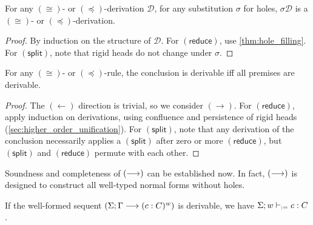 \documentclass[twoside]{report}
\begin{document}
\begin{proposition}
    \label{thm:conversion_calculus_stability}
    For any $(\cong)$- or $(\preceq)$-derivation $\mathcal D$, for any substitution $\sigma$ for holes, $\sigma \mathcal D$ is a $(\cong)$- or $(\preceq)$-derivation.
\end{proposition}

\begin{proof}
    By induction on the structure of $\mathcal D$. For $(\mathsf{reduce})$, use \cref{thm:hole_filling}. For $(\mathsf{split})$, note that rigid heads do not change under $\sigma$.
\end{proof}

\begin{proposition}
    \label{thm:conversion_calculus_inversion}
    For any $(\cong)$- or $(\preceq)$-rule, the conclusion is derivable iff all premises are derivable.
\end{proposition}

\begin{proof}
    The $(\leftarrow)$ direction is trivial, so we consider $(\rightarrow)$. For $(\mathsf{reduce})$, apply induction on derivations, using confluence and persistence of rigid heads (\cref{sec:higher_order_unification}). For $(\mathsf{split})$, note that any derivation of the conclusion necessarily applies a $(\mathsf{split})$ after zero or more $(\mathsf{reduce})$, but $(\mathsf{split})$ and $(\mathsf{reduce})$ permute with each other.
\end{proof}

Soundness and completeness of $(\longrightarrow)$ can be established now. In fact, $(\longrightarrow)$ is designed to construct all well-typed normal forms without holes.

\begin{proposition}
    \label{thm:focused_calculus_soundness}
    If the well-formed sequent $(\Sigma; \Gamma \longrightarrow (c : C)^w)$ is derivable, we have $\Sigma; w \vdash_{:=} c : C$.
\end{proposition}
\end{document}
